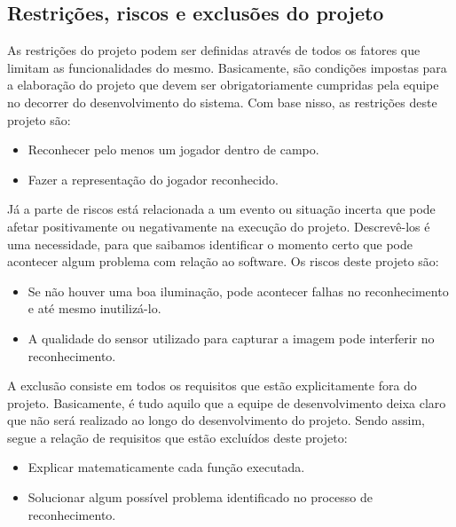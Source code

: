 \subsection{Restrições, riscos e exclusões do projeto}

As restrições do projeto podem ser definidas através de todos os fatores que limitam as funcionalidades do mesmo. Basicamente, são condições impostas para a elaboração do projeto que devem ser obrigatoriamente cumpridas pela equipe no decorrer do desenvolvimento do sistema. Com base nisso, as restrições deste projeto são:

\begin{itemize}
\raggedright \item Reconhecer pelo menos um jogador dentro de campo.
\raggedright \item Fazer a representação do jogador reconhecido.
\end{itemize}

Já a parte de riscos está relacionada a um evento ou situação incerta que pode afetar positivamente ou negativamente na execução do projeto. Descrevê-los é uma necessidade, para que saibamos identificar o momento certo que pode acontecer algum problema com relação ao software. Os riscos deste projeto são:

\begin{itemize}
\raggedright \item Se não houver uma boa iluminação, pode acontecer falhas no reconhecimento e até mesmo inutilizá-lo.
\raggedright \item A qualidade do sensor utilizado para capturar a imagem pode interferir no reconhecimento.
\end{itemize}

A exclusão consiste em todos os requisitos que estão explicitamente fora do projeto. Basicamente, é tudo aquilo que a equipe de desenvolvimento deixa claro que não será realizado ao longo do desenvolvimento do projeto. Sendo assim, segue a relação de requisitos que estão excluídos deste projeto:

\begin{itemize}
\raggedright \item Explicar matematicamente cada função executada.
\raggedright \item Solucionar algum possível problema identificado no processo de reconhecimento.
\end{itemize}